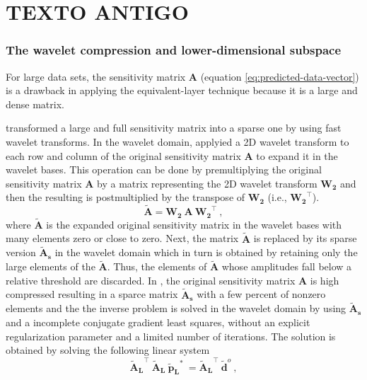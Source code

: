 \cite{takahashi-etal2022}

\section{TEXTO ANTIGO}

\subsubsection{The wavelet compression and lower-dimensional subspace}

For large data sets, the  sensitivity matrix $\mathbf{A}$ (equation \ref{eq:predicted-data-vector}) is a drawback in applying  
the equivalent-layer technique because it is a large and dense matrix.

\cite{li-oldenburg2010} transformed a large and full sensitivity matrix into a sparse one by using fast wavelet transforms.
In the wavelet domain, \cite{li-oldenburg2010} applyied a 2D wavelet transform to each row and column of the original sensitivity matrix $\mathbf{A}$ to expand it in the wavelet bases. 
This operation can be done by premultiplying the original sensitivity matrix $\mathbf{A}$ by a 
matrix representing the 2D wavelet transform $\mathbf{W_2}$ and then the resulting is postmultiplied by 
the transpose of $\mathbf{W_2}$ (i.e., $\mathbf{W_2}^{\top}$).
\begin{equation}
	\mathbf{\tilde{A}} = \mathbf{W_2} \: \mathbf{A}  \: \mathbf{W_2}^{\top} \:,
	\label{eq:A_li_oldenburg}
\end{equation}
where $\mathbf{\tilde{A}}$ is the expanded original sensitivity matrix in the wavelet bases with many elements zero or close to zero.
Next, the matrix $\mathbf{\tilde{A}}$ is replaced by its sparse version $\mathbf{\tilde{A}_{s}}$ 
in the wavelet domain which in turn is obtained by retaining only 
the large elements of the $\mathbf{\tilde{A}}$.
Thus, the elements of  $\mathbf{\tilde{A}}$ whose  amplitudes fall below a relative threshold are discarded.
In \cite{li-oldenburg2010}, the original sensitivity matrix $\mathbf{A}$ is high compressed resulting in 
a sparce matrix $\mathbf{\tilde{A}_{s}}$ with a few percent of nonzero elements and 
the the inverse problem is solved in the wavelet domain by using $\mathbf{\tilde{A}_{s}}$ and 
a incomplete conjugate gradient least squares, without an explicit regularization parameter and 
a limited number of iterations.
The solution is obtained by solving the following linear system
\begin{equation}
	 \mathbf{\tilde{A}_{L}}^{\top} \: \mathbf{\tilde{A}_{L}} \: \mathbf{\tilde{p}_{L}}^{\ast} \: =  
	 \mathbf{\tilde{A}_{L}}^{\top} \: \mathbf{\tilde{d}}^{o} \: ,
	\label{eq:linear_system_li_oldenburg}
\end{equation}
